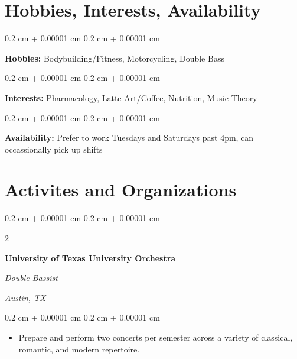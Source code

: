 \documentclass[10pt, letterpaper]{article}
\newenvironment{highlights}{
    \begin{itemize}[
        topsep=0.10 cm,
        parsep=0.10 cm,
        partopsep=0pt,
        itemsep=0pt,
        leftmargin=0.4 cm + 10pt
    ]
}{
    \end{itemize}
} %
\newenvironment{onecolentry}{
    \begin{adjustwidth}{
        0.2 cm + 0.00001 cm
    }{
        0.2 cm + 0.00001 cm
    }
}{
    \end{adjustwidth}
} %
\newenvironment{twocolentry}[2][]{
    \onecolentry
    \def\secondColumn{#2}
    \setcolumnwidth{\fill, 4.5 cm}
    \begin{paracol}{2}
}{
    \switchcolumn \raggedleft \secondColumn
    \end{paracol}
    \endonecolentry
} %
\begin{document}
    
    \section{Hobbies, Interests, Availability}



        
        \begin{onecolentry}
            \textbf{Hobbies:} Bodybuilding/Fitness, Motorcycling, Double Bass
        \end{onecolentry}

        \vspace{0.2 cm}

        \begin{onecolentry}
            \textbf{Interests:} Pharmacology, Latte Art/Coffee, Nutrition, Music Theory
        \end{onecolentry}

        \vspace{0.2 cm}

        \begin{onecolentry}
            \textbf{Availability:} Prefer to work Tuesdays and Saturdays past 4pm, can occassionally pick up shifts
        \end{onecolentry}


    
    \section{Activites and Organizations}



        
        \begin{twocolentry}{
        \textit{Austin, TX}    
            
        }
            \textbf{University of Texas University Orchestra}
            
            \textit{Double Bassist}
        \end{twocolentry}

        \vspace{0.10 cm}
        \begin{onecolentry}
            \begin{highlights}
                \item Prepare and perform two concerts per semester across a variety of classical, romantic, and modern repertoire.
            \end{highlights}
        \end{onecolentry}



    
\end{document}
